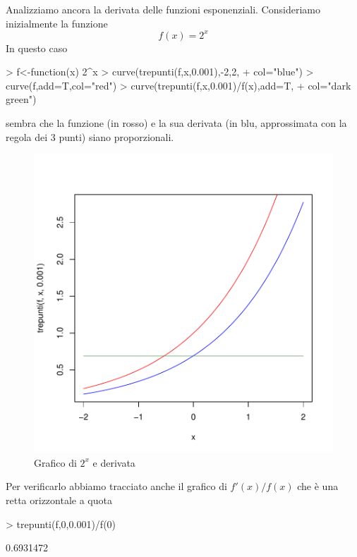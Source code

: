 \documentclass[onecolumn,11pt]{book}
\begin{document}
Analizziamo ancora la derivata delle funzioni esponenziali. Consideriamo inizialmente
la funzione
$$f(x)=2^x$$ 
In questo caso
\begin{Schunk}
\begin{Sinput}
> f<-function(x) 2^x
> curve(trepunti(f,x,0.001),-2,2,
+ col="blue")
> curve(f,add=T,col="red")
> curve(trepunti(f,x,0.001)/f(x),add=T,
+ col="dark green")
\end{Sinput}
\end{Schunk}
sembra che  la funzione (in rosso) e la sua derivata (in blu, approssimata con la regola dei 3 punti)   siano proporzionali.
\begin{figure}[ htbp]
\begin{center}
\includegraphics{Rmatematica-118}
\caption{Grafico di $2^x$ e derivata}
\label{fig:der2x}
\end{center}
\end{figure}
Per verificarlo abbiamo tracciato anche il grafico di $f'(x)/f(x)$ che \`e una retta orizzontale a quota
\begin{Schunk}
\begin{Sinput}
>  trepunti(f,0,0.001)/f(0)
\end{Sinput}
\begin{Soutput}
[1] 0.6931472
\end{Soutput}
\end{Schunk}
\end{document}

